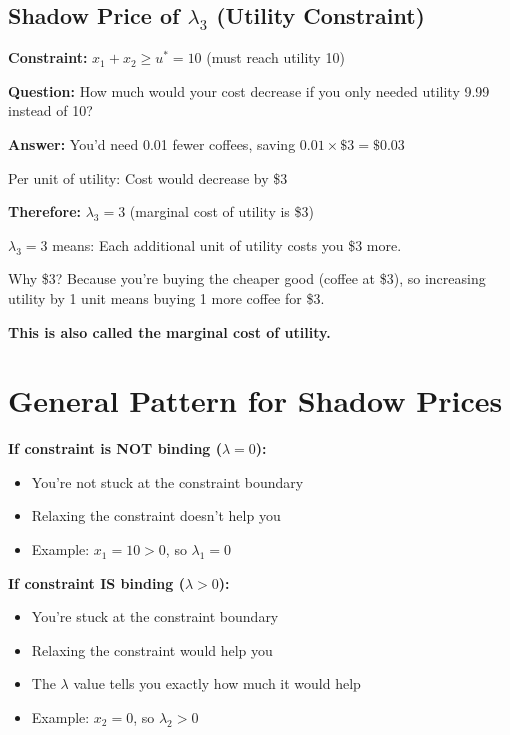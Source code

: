 \documentclass[11pt]{article}
\begin{document}
\subsection{Shadow Price of $\lambda_3$ (Utility Constraint)}

\textbf{Constraint:} $x_1 + x_2 \geq u^* = 10$ (must reach utility 10)

\textbf{Question:} How much would your cost decrease if you only needed utility 9.99 instead of 10?

\textbf{Answer:} You'd need 0.01 fewer coffees, saving $0.01 \times \$3 = \$0.03$

Per unit of utility: Cost would decrease by \$3

\textbf{Therefore:} $\lambda_3 = 3$ (marginal cost of utility is \$3)

\begin{tcolorbox}[colback=green!5!white,colframe=green!75!black,title=Interpretation]
$\lambda_3 = 3$ means: Each additional unit of utility costs you \$3 more.

Why \$3? Because you're buying the cheaper good (coffee at \$3), so increasing utility by 1 unit means buying 1 more coffee for \$3.

\textbf{This is also called the marginal cost of utility.}
\end{tcolorbox}

\section{General Pattern for Shadow Prices}

\begin{tcolorbox}[colback=yellow!10!white,colframe=orange!75!black,title=How Shadow Prices Work]

\textbf{If constraint is NOT binding ($\lambda = 0$):}
\begin{itemize}
\item You're not stuck at the constraint boundary
\item Relaxing the constraint doesn't help you
\item Example: $x_1 = 10 > 0$, so $\lambda_1 = 0$
\end{itemize}

\textbf{If constraint IS binding ($\lambda > 0$):}
\begin{itemize}
\item You're stuck at the constraint boundary
\item Relaxing the constraint would help you
\item The $\lambda$ value tells you exactly how much it would help
\item Example: $x_2 = 0$, so $\lambda_2 > 0$
\end{itemize}

\end{tcolorbox}
\end{document}
